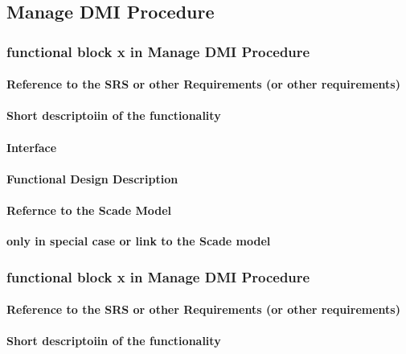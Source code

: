 \subsection{Manage DMI Procedure}

\subsubsection{functional block x in Manage DMI Procedure}%
\paragraph{Reference to the SRS or other Requirements (or other requirements)}
\paragraph{Short descriptoiin of the functionality}
\paragraph{Interface}
\paragraph{Functional Design Description}
\paragraph{Refernce to the Scade Model}
\textbf{only in special case or link to the Scade model}

\subsubsection{functional block x in Manage DMI Procedure}%
\paragraph{Reference to the SRS or other Requirements (or other requirements)}
\paragraph{Short descriptoiin of the functionality}
